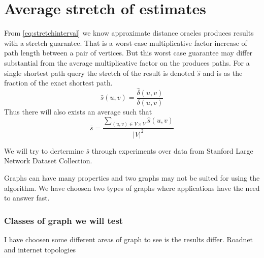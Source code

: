 \chapter{Average stretch of estimates}
From \autoref{eq:stretchinterval} we know approximate distance oracles
produces results with a stretch guarantee. That is a worst-case multiplicative
factor increase of path length between a pair of vertices. But this worst case
guarantee may differ substantial from the average multiplicative factor on the
produces paths. For a single shortest path query the stretch of the result is
denoted $\hat{s}$ and is as the fraction of the exact shortest path.
\begin{equation}
    \hat{s}(u,v) = \frac{\hat{\delta}(u,v)}{\delta(u,v)}
\end{equation}
Thus there will also exists an average such that
\begin{equation}
    \bar{s} = \frac{\sum\limits_{(u,v) \in V \times V} \hat{s}(u,v) }{|V|^2}
\end{equation}

We will try to dertermine $\bar{s}$ through experiments over data from
Stanford Large Network Dataset Collection.

Graphs can have many properties and two graphs may not be suited for using the
algorithm. We have choosen two types of graphs where applications have the need
to answer fast.





\subsection*{Classes of graph we will test}
I have choosen some different areas of graph to see is the results differ.
Roadnet and internet topologies

